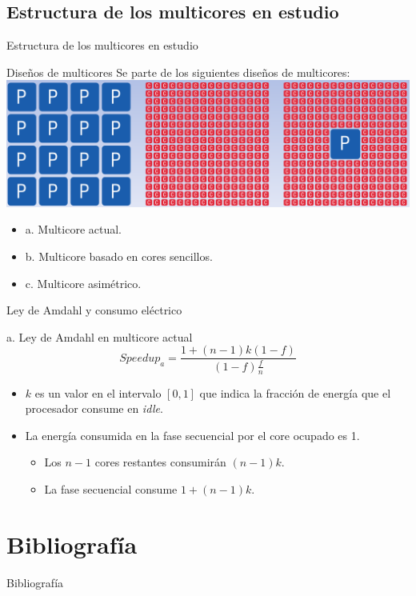 \documentclass[utf8]{beamer}
\begin{document}
\subsection*{Estructura de los multicores en estudio}
\begin{frame}{Estructura de los multicores en estudio}
    \begin{block}{Diseños de multicores}
        Se parte de los siguientes diseños de multicores:
        \\
        \center\includegraphics[width=.8\linewidth]{figures/amd_power_structures}
        
        \begin{itemize}
            \item a. Multicore actual. 
            \item b. Multicore basado en cores sencillos.
            \item c. Multicore asimétrico.
        \end{itemize}
    \end{block}    
    
\end{frame}

\begin{frame}{Ley de Amdahl y consumo eléctrico}
    \begin{block}{a. Ley de Amdahl en multicore actual}
        $$ Speedup_{a} = \frac{1 + (n - 1)k(1-f)}{(1 - f)\frac{f}{n}} $$
        \begin{itemize}
             \item $ k $ es un valor en el intervalo $ [0,1] $ que indica la fracción de energía que el procesador consume en \textit{idle}.
             \item La energía consumida en la fase secuencial por el core ocupado es 1.
                \begin{itemize}
                    \item Los $ n -1 $ cores restantes consumirán $ (n -1)k $.
                    \item La fase secuencial consume $ 1 +  (n -1)k $.
                \end{itemize}
        \end{itemize}
        
    \end{block}    
    
\end{frame}

\section{Bibliografía}

\begin{frame}[allowframebreaks]{Bibliografía}
    \nocite{*}
    
    
\end{frame}
\end{document}

